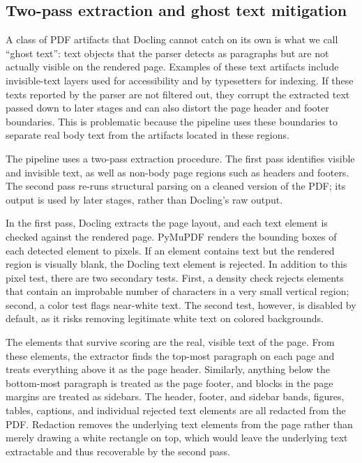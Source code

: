 \subsection{Two-pass extraction and ghost text mitigation}\label{subsec:doc-two-pass}

A class of PDF artifacts that Docling cannot catch on its own is what we call ``ghost text'': text objects that the parser detects as paragraphs but are not actually visible on the rendered page. Examples of these text artifacts include invisible-text layers used for accessibility and by typesetters for indexing. If these texts reported by the parser are not filtered out, they corrupt the extracted text passed down to later stages and can also distort the page header and footer boundaries. This is problematic because the pipeline uses these boundaries to separate real body text from the artifacts located in these regions. 

The pipeline uses a two-pass extraction procedure. The first pass identifies visible and invisible text, as well as non-body page regions such as headers and footers. The second pass re-runs structural parsing on a cleaned version of the PDF; its output is used by later stages, rather than Docling's raw output. 

In the first pass, Docling extracts the page layout, and each text element is checked against the rendered page. PyMuPDF renders the bounding boxes of each detected element to pixels. If an element contains text but the rendered region is visually blank, the Docling text element is rejected. In addition to this pixel test, there are two secondary tests. First, a density check rejects elements that contain an improbable number of characters in a very small vertical region; second, a color test flags near-white text. The second test, however, is disabled by default, as it risks removing legitimate white text on colored backgrounds.

The elements that survive scoring are the real, visible text of the page. From these elements, the extractor finds the top-most paragraph on each page and treats everything above it as the page header. Similarly, anything below the bottom-most paragraph is treated as the page footer, and blocks in the page margins are treated as sidebars. The header, footer, and sidebar bands, figures, tables, captions, and individual rejected text elements are all redacted from the PDF. Redaction removes the underlying text elements from the page rather than merely drawing a white rectangle on top, which would leave the underlying text extractable and thus recoverable by the second pass.

